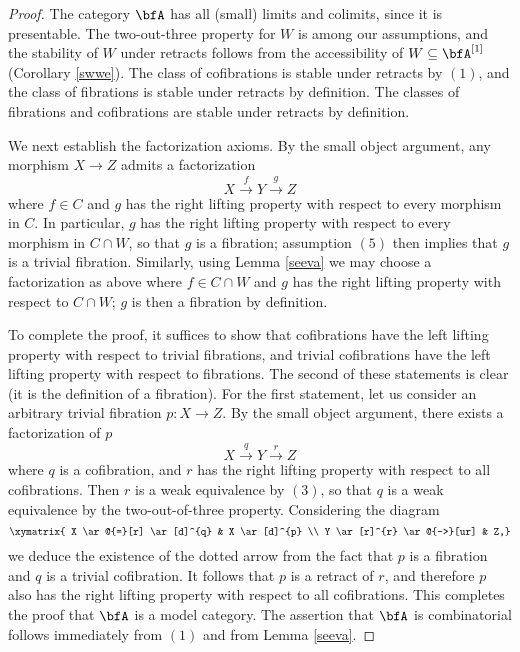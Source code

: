 \begin{proof}
The category $\bfA$ has all (small) limits and colimits, since it is presentable. The two-out-three property for $W$ is among our assumptions, and the stability of $W$ under retracts follows from the accessibility of $W \subseteq \bfA^{[1]}$ (Corollary \ref{swwe}). The class of cofibrations is stable under retracts by $(1)$, and the class of fibrations is stable under retracts by definition.
The classes of fibrations and cofibrations are stable under retracts by definition.

We next establish the factorization axioms. By the small object argument, any morphism
$X \rightarrow Z$ admits a factorization
$$X \stackrel{f}{\rightarrow} Y \stackrel{g}{\rightarrow} Z$$
where $f \in C$ and $g$ has the right lifting property with respect to every morphism in $C$.
In particular, $g$ has the right lifting property with respect to every morphism in $C \cap W$, so that $g$ is a fibration; assumption $(5)$ then implies that $g$ is a trivial fibration.
Similarly, using Lemma \ref{seeva} we may choose a factorization as above where $f \in C \cap W$ and $g$ has the right lifting property with respect to $C \cap W$; $g$ is then a fibration by definition.

To complete the proof, it suffices to show that cofibrations have the left lifting property with respect to trivial fibrations, and trivial cofibrations have the left lifting property with respect to fibrations. The second of these statements is clear (it is the definition of a fibration). For the first statement, let us consider an arbitrary trivial fibration $p: X \rightarrow Z$. By the small object argument,
there exists a factorization of $p$
$$ X \stackrel{q}{\rightarrow} Y \stackrel{r}{\rightarrow} Z$$
where $q$ is a cofibration, and $r$ has the right lifting property with respect to all cofibrations.
Then $r$ is a weak equivalence by $(3)$, so that $q$ is a weak equivalence by the two-out-of-three property. Considering the diagram
$$ \xymatrix{ X \ar@{=}[r] \ar[d]^{q} & X \ar[d]^{p} \\
Y \ar[r]^{r} \ar@{-->}[ur] & Z,}$$
we deduce the existence of the dotted arrow from the fact that $p$ is a fibration and $q$ is a trivial
cofibration. It follows that $p$ is a retract of $r$, and therefore $p$ also has the right lifting property with respect to all cofibrations. This completes the proof that $\bfA$ is a model category. The assertion that $\bfA$ is combinatorial follows immediately from $(1)$ and from Lemma \ref{seeva}.
\end{proof}


